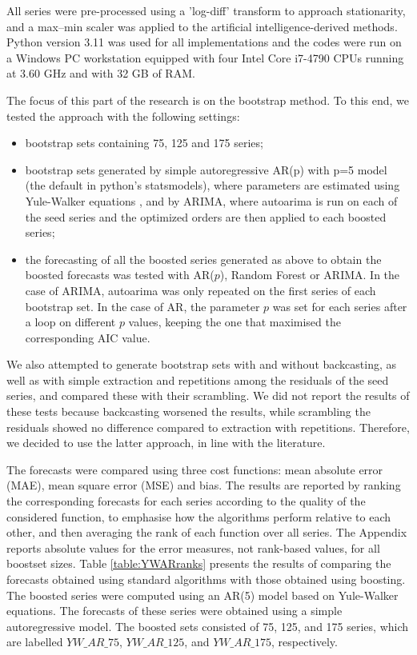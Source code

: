 \documentclass[opre,sglanonrev,11pt]{informs4}
\begin{document}
All series were pre-processed using a 'log-diff' transform to approach stationarity, and a max–min scaler was applied to the artificial intelligence-derived methods. Python version 3.11 was used for all implementations and the codes were run on a Windows PC workstation equipped with four Intel Core i7-4790 CPUs running at 3.60 GHz and with 32 GB of RAM.

The focus of this part of the research is on the bootstrap method. To this end, we tested the approach with the following settings:
\begin{itemize}
	\item bootstrap sets containing 75, 125 and 175 series;
	\item bootstrap sets generated by simple autoregressive AR(p) with p=5 model (the default in python's statsmodels), where parameters are estimated using Yule-Walker equations \citep{BD91}, and by ARIMA, where autoarima is run on each of the seed series and the optimized orders are then applied to each boosted series;
	\item the forecasting of all the boosted series generated as above to obtain the boosted forecasts was tested with AR($p$), Random Forest or ARIMA. In the case of ARIMA, autoarima was only repeated on the first series of each bootstrap set. In the case of AR, the parameter $p$ was set for each series after a loop on different $p$ values, keeping the one that maximised the corresponding AIC value.
\end{itemize}

We also attempted to generate bootstrap sets with and without backcasting, as well as with simple extraction and repetitions among the residuals of the seed series, and compared these with their scrambling. We did not report the results of these tests because backcasting worsened the results, while scrambling the residuals showed no difference compared to extraction with repetitions. Therefore, we decided to use the latter approach, in line with the literature.

The forecasts were compared using three cost functions: mean absolute error (MAE), mean square error (MSE) and bias. The results are reported by ranking the corresponding forecasts for each series according to the quality of the considered function, to emphasise how the algorithms perform relative to each other, and then averaging the rank of each function over all series. The Appendix reports absolute values for the error measures, not rank-based values, for all boostset sizes. 
Table \ref{table:YWARranks} presents the results of comparing the forecasts obtained using standard algorithms with those obtained using boosting. The boosted series were computed using an AR(5) model based on Yule-Walker equations. The forecasts of these series were obtained using a simple autoregressive model. The boosted sets consisted of 75, 125, and 175 series, which are labelled $YW\_AR\_75$, $YW\_AR\_125$, and $YW\_AR\_175$, respectively.
\end{document}
